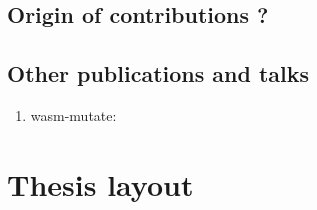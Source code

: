 \subsection*{Origin of contributions ?}

\subsection*{Other publications and talks}

\begin{enumerate}
    \item wasm-mutate: \todo{}
\end{enumerate}

\section*{Thesis layout}